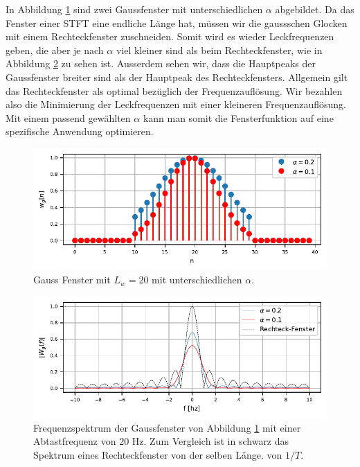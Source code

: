 In Abbildung \ref{sonogramm:gausstime} sind zwei Gaussfenster mit unterschiedlichen 
$\alpha$ abgebildet.
Da das Fenster einer STFT eine endliche Länge hat, müssen wir die gaussschen Glocken 
mit einem Rechteckfenster zuschneiden. 
Somit wird es wieder Leckfrequenzen geben, die aber je nach $\alpha$ viel kleiner sind
als beim Rechteckfenster, wie in Abbildung \ref{sonogramm:gaussfreq} zu sehen ist.
Ausserdem sehen wir, dass die Hauptpeaks der Gaussfenster breiter sind als der 
Hauptpeak des Rechteckfensters.
Allgemein gilt das Rechteckfenster als optimal bezüglich der Frequenzauflösung.
Wir bezahlen also die Minimierung der Leckfrequenzen mit einer kleineren Frequenzauflösung. 
Mit einem passend gewählten $\alpha$ kann man somit die Fensterfunktion auf eine spezifische
Anwendung optimieren.

\begin{figure}
    \centering
    \includegraphics{papers/sonogramm/images/gauss_time.pdf}
    \caption{Gauss Fenster mit $L_w = 20$ mit unterschiedlichen $\alpha$.
    \label{sonogramm:gausstime}
    }
\end{figure}

\begin{figure}
    \centering
    \includegraphics{papers/sonogramm/images/gauss_freq.pdf}
    \caption{Frequenzspektrum der Gaussfenster von Abbildung \ref{sonogramm:gausstime}
    mit einer Abtastfrequenz von 20 Hz. Zum Vergleich ist in schwarz das Spektrum eines Rechteckfenster 
    von der selben Länge.
    von $1/T$.
    \label{sonogramm:gaussfreq}
    }
\end{figure}

